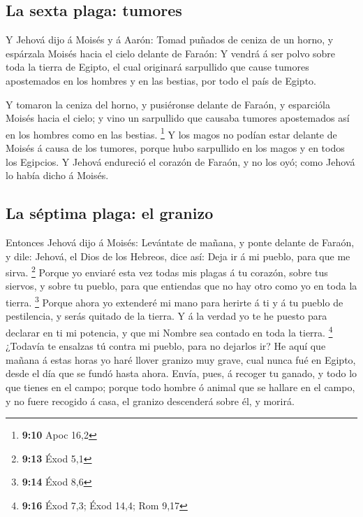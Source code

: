 \hypertarget{la-sexta-plaga-tumores}{%
\subsection{La sexta plaga: tumores}\label{la-sexta-plaga-tumores}}

 Y Jehová dijo á Moisés y á Aarón: Tomad puñados de ceniza
de un horno, y espárzala Moisés hacia el cielo delante de Faraón:
 Y vendrá á ser polvo sobre toda la tierra de Egipto, el
cual originará sarpullido que cause tumores apostemados en los hombres y
en las bestias, por todo el país de Egipto.

 Y tomaron la ceniza del horno, y pusiéronse delante de
Faraón, y esparcióla Moisés hacia el cielo; y vino un sarpullido que
causaba tumores apostemados así en los hombres como en las bestias.
\footnote{\textbf{9:10} Apoc 16,2}  Y los magos no podían
estar delante de Moisés á causa de los tumores, porque hubo sarpullido
en los magos y en todos los Egipcios.  Y Jehová endureció
el corazón de Faraón, y no los oyó; como Jehová lo había dicho á Moisés.

\hypertarget{la-suxe9ptima-plaga-el-granizo}{%
\subsection{La séptima plaga: el
granizo}\label{la-suxe9ptima-plaga-el-granizo}}

 Entonces Jehová dijo á Moisés: Levántate de mañana, y
ponte delante de Faraón, y dile: Jehová, el Dios de los Hebreos, dice
así: Deja ir á mi pueblo, para que me sirva. \footnote{\textbf{9:13}
  Éxod 5,1}  Porque yo enviaré esta vez todas mis plagas
á tu corazón, sobre tus siervos, y sobre tu pueblo, para que entiendas
que no hay otro como yo en toda la tierra. \footnote{\textbf{9:14} Éxod
  8,6}  Porque ahora yo extenderé mi mano para herirte á
ti y á tu pueblo de pestilencia, y serás quitado de la tierra.
 Y á la verdad yo te he puesto para declarar en ti mi
potencia, y que mi Nombre sea contado en toda la tierra. \footnote{\textbf{9:16}
  Éxod 7,3; Éxod 14,4; Rom 9,17}  ¿Todavía te ensalzas tú
contra mi pueblo, para no dejarlos ir?  He aquí que
mañana á estas horas yo haré llover granizo muy grave, cual nunca fué en
Egipto, desde el día que se fundó hasta ahora.  Envía,
pues, á recoger tu ganado, y todo lo que tienes en el campo; porque todo
hombre ó animal que se hallare en el campo, y no fuere recogido á casa,
el granizo descenderá sobre él, y morirá.

